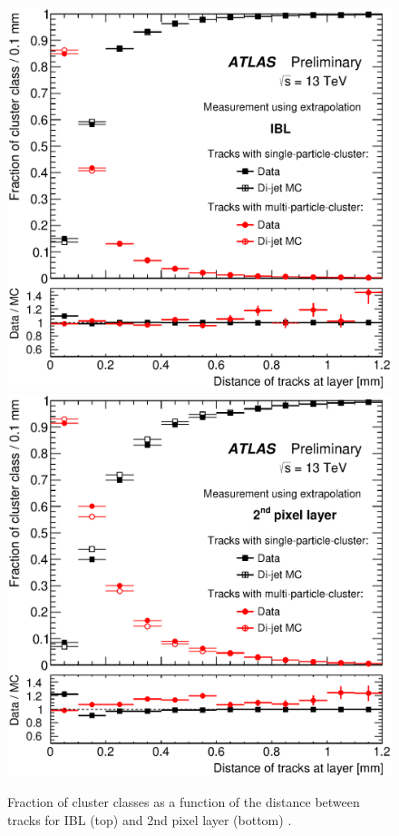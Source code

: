 \begin{centering}
\begin{figure}[!htb]
\myfloatalign
\includegraphics[width=.9\linewidth]{figures/nn/fig_07a.eps}
\includegraphics[width=.9\linewidth]{figures/nn/fig_07b.eps}
\caption{Fraction of cluster classes as a function of the distance between tracks for IBL (top) and 2nd pixel layer (bottom) \cite{ATL-PHYS-PUB-2015-044}.}
\label{fig:13tev_fractions}
\end{figure}
\end{centering}



